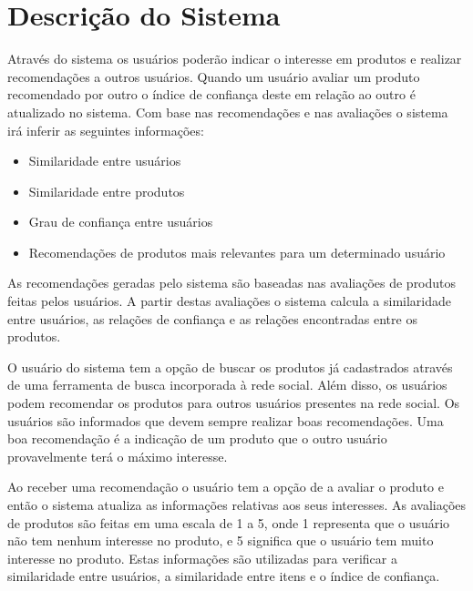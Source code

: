
\section{Descrição do Sistema}

 Através do sistema os usuários poderão indicar o interesse em produtos e realizar recomendações a outros usuários. Quando um usuário avaliar um produto recomendado por outro o índice de confiança deste em relação ao outro é atualizado no sistema. Com base nas recomendações e nas avaliações o sistema irá inferir as seguintes informações:
 
\begin{itemize}

 \item Similaridade entre usuários

 \item Similaridade entre produtos

 \item Grau de confiança entre usuários

 \item Recomendações de produtos mais relevantes para um determinado usuário

\end{itemize}

 As recomendações geradas pelo sistema são baseadas nas avaliações de produtos feitas pelos usuários. A partir destas avaliações o sistema calcula a similaridade entre usuários, as relações de confiança e as relações encontradas entre os produtos.

  O usuário do sistema tem a opção de buscar os produtos já cadastrados através de uma ferramenta de busca incorporada à rede social. Além disso, os usuários podem recomendar os produtos para outros usuários presentes na rede social. Os usuários são informados que devem sempre realizar boas recomendações. Uma boa recomendação é a indicação de um produto que o outro usuário provavelmente terá o máximo interesse.

 Ao receber uma recomendação o usuário tem a opção de a avaliar o produto e então o sistema atualiza as informações relativas aos seus interesses. As avaliações de produtos são feitas em uma escala de 1 a 5, onde 1 representa que o usuário não tem nenhum interesse no produto, e 5 significa que o usuário tem muito interesse no produto. Estas informações são utilizadas para verificar a similaridade entre usuários, a similaridade entre itens e o índice de confiança.
 

